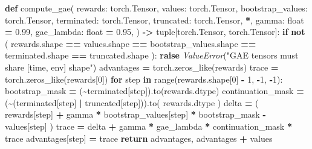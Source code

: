 \documentclass[
  american,
  11pt,
  letterpaper,
]{article}
\newenvironment{Shaded}{\begin{snugshade}}{\end{snugshade}}
\newcommand{\BuiltInTok}[1]{#1}
\newcommand{\ControlFlowTok}[1]{\textcolor[rgb]{0.13,0.29,0.53}{\textbf{#1}}}
\newcommand{\DecValTok}[1]{\textcolor[rgb]{0.00,0.00,0.81}{#1}}
\newcommand{\FloatTok}[1]{\textcolor[rgb]{0.00,0.00,0.81}{#1}}
\newcommand{\KeywordTok}[1]{\textcolor[rgb]{0.13,0.29,0.53}{\textbf{#1}}}
\newcommand{\NormalTok}[1]{#1}
\newcommand{\OperatorTok}[1]{\textcolor[rgb]{0.81,0.36,0.00}{\textbf{#1}}}
\newcommand{\PreprocessorTok}[1]{\textcolor[rgb]{0.56,0.35,0.01}{\textit{#1}}}
\newcommand{\StringTok}[1]{\textcolor[rgb]{0.31,0.60,0.02}{#1}}
\renewenvironment{Shaded}{\par\smallskip}{\par\smallskip}
\begin{document}
\begin{Shaded}
\begin{Highlighting}[]
\KeywordTok{def}\NormalTok{ compute\_gae(}
\NormalTok{    rewards: torch.Tensor,}
\NormalTok{    values: torch.Tensor,}
\NormalTok{    bootstrap\_values: torch.Tensor,}
\NormalTok{    terminated: torch.Tensor,}
\NormalTok{    truncated: torch.Tensor,}
    \OperatorTok{*}\NormalTok{,}
\NormalTok{    gamma: }\BuiltInTok{float} \OperatorTok{=} \FloatTok{0.99}\NormalTok{,}
\NormalTok{    gae\_lambda: }\BuiltInTok{float} \OperatorTok{=} \FloatTok{0.95}\NormalTok{,}
\NormalTok{) }\OperatorTok{{-}\textgreater{}} \BuiltInTok{tuple}\NormalTok{[torch.Tensor, torch.Tensor]:}
    \ControlFlowTok{if} \KeywordTok{not}\NormalTok{ (}
\NormalTok{        rewards.shape}
        \OperatorTok{==}\NormalTok{ values.shape}
        \OperatorTok{==}\NormalTok{ bootstrap\_values.shape}
        \OperatorTok{==}\NormalTok{ terminated.shape}
        \OperatorTok{==}\NormalTok{ truncated.shape}
\NormalTok{    ):}
        \ControlFlowTok{raise} \PreprocessorTok{ValueError}\NormalTok{(}\StringTok{"GAE tensors must share [time, env] shape"}\NormalTok{)}
\NormalTok{    advantages }\OperatorTok{=}\NormalTok{ torch.zeros\_like(rewards)}
\NormalTok{    trace }\OperatorTok{=}\NormalTok{ torch.zeros\_like(rewards[}\DecValTok{0}\NormalTok{])}
    \ControlFlowTok{for}\NormalTok{ step }\KeywordTok{in} \BuiltInTok{range}\NormalTok{(rewards.shape[}\DecValTok{0}\NormalTok{] }\OperatorTok{{-}} \DecValTok{1}\NormalTok{, }\OperatorTok{{-}}\DecValTok{1}\NormalTok{, }\OperatorTok{{-}}\DecValTok{1}\NormalTok{):}
\NormalTok{        bootstrap\_mask }\OperatorTok{=}\NormalTok{ (}\OperatorTok{\textasciitilde{}}\NormalTok{terminated[step]).to(rewards.dtype)}
\NormalTok{        continuation\_mask }\OperatorTok{=}\NormalTok{ (}\OperatorTok{\textasciitilde{}}\NormalTok{(terminated[step] }\OperatorTok{|}\NormalTok{ truncated[step])).to(}
\NormalTok{            rewards.dtype}
\NormalTok{        )}
\NormalTok{        delta }\OperatorTok{=}\NormalTok{ (}
\NormalTok{            rewards[step]}
            \OperatorTok{+}\NormalTok{ gamma }\OperatorTok{*}\NormalTok{ bootstrap\_values[step] }\OperatorTok{*}\NormalTok{ bootstrap\_mask}
            \OperatorTok{{-}}\NormalTok{ values[step]}
\NormalTok{        )}
\NormalTok{        trace }\OperatorTok{=}\NormalTok{ delta }\OperatorTok{+}\NormalTok{ gamma }\OperatorTok{*}\NormalTok{ gae\_lambda }\OperatorTok{*}\NormalTok{ continuation\_mask }\OperatorTok{*}\NormalTok{ trace}
\NormalTok{        advantages[step] }\OperatorTok{=}\NormalTok{ trace}
    \ControlFlowTok{return}\NormalTok{ advantages, advantages }\OperatorTok{+}\NormalTok{ values}



\end{Highlighting}
\end{Shaded}
\end{document}
